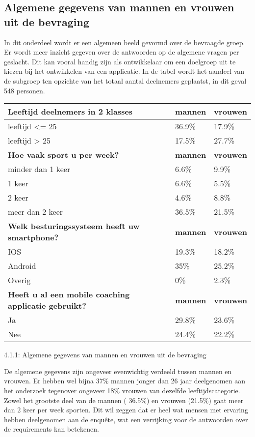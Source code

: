\subsection{Algemene gegevens  van mannen en vrouwen uit de bevraging}
\label{sec:Resultaten vragenlijst}
In dit onderdeel wordt er een algemeen beeld gevormd over de bevraagde groep. Er wordt meer inzicht gegeven over de antwoorden op de algemene vragen per geslacht. Dit kan vooral handig zijn als ontwikkelaar om een doelgroep uit te kiezen bij het ontwikkelen van een applicatie. In de tabel wordt het aandeel van de subgroep ten opzichte van het totaal aantal deelnemers geplaatst, in dit geval 548 personen. 
\begin{center}
\begin{tabular}{ |p{10cm}|p{2cm}|p{2cm}| }
 \hline
 \textbf{Leeftijd deelnemers in 2 klasses} & \textbf{mannen} &\textbf{vrouwen}\\ 
 \hline
 leeftijd <= 25   & 36.9\%    &17.9\%   \\
 leeftijd > 25 &   17.5\%  &27.7\%   \\
 \hline
  \textbf{Hoe vaak sport u per week? } & \textbf{mannen} &\textbf{vrouwen}\\ 
 \hline
 minder dan 1 keer   & 6.6\%   & 9.9\%  \\
 1 keer &   6.6\%  & 5.5\%   \\
 2 keer &   4.6\%& 8.8\%   \\
meer dan 2 keer &  36.5\% & 21.5\%  \\
 \hline
   \textbf{Welk besturingssysteem heeft uw smartphone?}  & \textbf{mannen} &\textbf{vrouwen}\\ 
 \hline
IOS   & 19.3\%   &18.2\%   \\
Android &   35\%  &25.2\%   \\
Overig &   0\%  & 2.3\%  \\
 \hline
    \textbf{Heeft u al een mobile coaching applicatie gebruikt?}  & \textbf{mannen} &\textbf{vrouwen}\\ 
 \hline
Ja   & 29.8\%  &23.6\%   \\
Nee &   24.4\%  &22.2\%   \\
  \hline
\end{tabular}
\caption{4.1.1: Algemene gegevens  van mannen en vrouwen uit de bevraging}
\end{center}
\newpage
De algemene gegevens zijn ongeveer evenwichtig verdeeld tussen mannen en vrouwen. Er hebben wel bijna 37\% mannen jonger dan 26 jaar deelgenomen aan het onderzoek tegenover ongeveer 18\% vrouwen van dezelfde leeftijdscategorie. Zowel het grootste deel van de mannen ( 36.5\%) en vrouwen (21.5\%) gaat meer dan 2 keer per week sporten. Dit wil zeggen dat er heel wat mensen met ervaring hebben deelgenomen aan de enquête, wat een verrijking voor de antwoorden over de requirements kan betekenen. 



